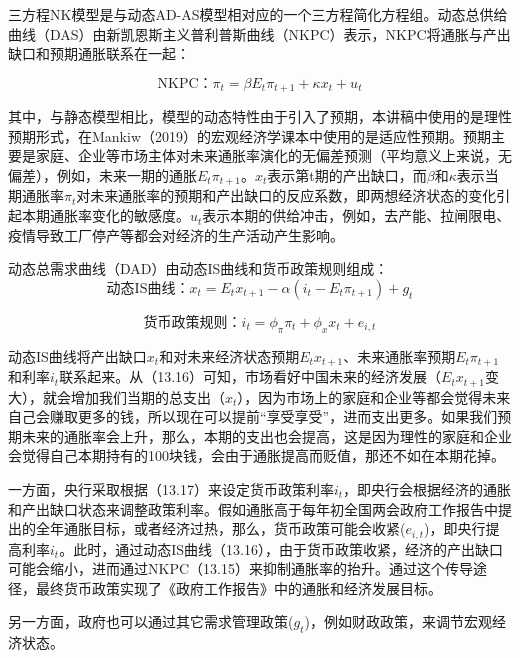 \documentclass[cn,12pt,math=newtx,citestyle=gb7714-2015,bibstyle=gb7714-2015]{elegantbook}
\begin{document}
	三方程NK模型是与动态AD-AS模型相对应的一个三方程简化方程组。动态总供给曲线（DAS）由新凯恩斯主义普利普斯曲线（NKPC）表示，NKPC将通胀与产出缺口和预期通胀联系在一起：
	
	\begin{equation}
		\text{NKPC：}\pi_t =\beta E_t \pi_{t+1} + \kappa x_t + u_t
	\end{equation}

    其中，与静态模型相比，模型的动态特性由于引入了预期，本讲稿中使用的是理性预期形式，在Mankiw（2019）的宏观经济学课本中使用的是适应性预期。预期主要是家庭、企业等市场主体对未来通胀率演化的无偏差预测（平均意义上来说，无偏差），例如，未来一期的通胀$E_t \pi_{t+1}$。$x_t$表示第t期的产出缺口，而$\beta$和$\kappa$表示当期通胀率$\pi_t$对未来通胀率的预期和产出缺口的反应系数，即两想经济状态的变化引起本期通胀率变化的敏感度。$u_t$表示本期的供给冲击，例如，去产能、拉闸限电、疫情导致工厂停产等都会对经济的生产活动产生影响。
    
    动态总需求曲线（DAD）由动态IS曲线和货币政策规则组成：
    	\begin{equation}
    	\text{动态IS曲线：}x_t = E_t x_{t+1} - \alpha(i_t - E_t\pi_{t+1} )+ g_t
    \end{equation}
    
    \begin{equation}
    	\text{货币政策规则：} i_t =\phi_\pi \pi_{t} + \phi_x x_t + e_{i,t}
    \end{equation}

    动态IS曲线将产出缺口$x_t$和对未来经济状态预期$E_t x_{t+1}$、未来通胀率预期$E_t\pi_{t+1} $和利率$i_t$联系起来。从（13.16）可知，市场看好中国未来的经济发展（$E_t x_{t+1}$变大），就会增加我们当期的总支出（$x_t$），因为市场上的家庭和企业等都会觉得未来自己会赚取更多的钱，所以现在可以提前“享受享受”，进而支出更多。如果我们预期未来的通胀率会上升，那么，本期的支出也会提高，这是因为理性的家庭和企业会觉得自己本期持有的100块钱，会由于通胀提高而贬值，那还不如在本期花掉。
    
    一方面，央行采取根据（13.17）来设定货币政策利率$i_t$，即央行会根据经济的通胀和产出缺口状态来调整政策利率。假如通胀高于每年初全国两会政府工作报告中提出的全年通胀目标，或者经济过热，那么，货币政策可能会收紧($e_{i,t}$)，即央行提高利率$i_t$。此时，通过动态IS曲线（13.16），由于货币政策收紧，经济的产出缺口可能会缩小，进而通过NKPC（13.15）来抑制通胀率的抬升。通过这个传导途径，最终货币政策实现了《政府工作报告》中的通胀和经济发展目标。
    
    另一方面，政府也可以通过其它需求管理政策($g_t$)，例如财政政策，来调节宏观经济状态。
	
\end{document}
